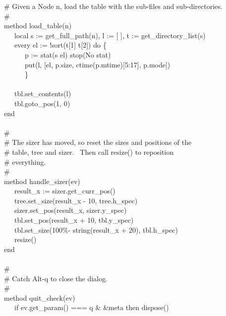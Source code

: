 {\>   \# Given a Node n, load the table with the sub-files and sub-directories.\\
\>   \# \\
\>   method load\_table(n) \\
\>   \ \ \ local s := get\_full\_path(n), l := [ ], t := get\_directory\_list(s) \\
\>   \ \ \ every el := !sort(t[1] {\textbar}{\textbar}{\textbar} t[2])
do \{ \\
\>   \ \ \ \ \ \ p := stat(s {\textbar}{\textbar} el) {\textbar}
stop({\textquotedbl}No stat{\textquotedbl}) \\
\>   \ \ \ \ \ \ put(l, [el, p.size, ctime(p.mtime)[5:17], p.mode]) \\
\>   \ \ \ \ \ \ \} \\
\ \\
\>   \ \ \ tbl.set\_contents(l) \\
\>   \ \ \ tbl.goto\_pos(1, 0) \\
\>   end \\
\ \\
\>   \# \\
\>   \# The sizer has moved, so reset the sizes and positions of the \\
\>   \# table, tree and sizer. \ Then call resize() to reposition \\
\>   \# everything. \\
\>   \# \\
\>   method handle\_sizer(ev) \\
\>   \ \ \ result\_x := sizer.get\_curr\_pos() \\
\>   \ \ \ tree.set\_size(result\_x - 10, tree.h\_spec) \\
\>   \ \ \ sizer.set\_pos(result\_x, sizer.y\_spec) \\
\>   \ \ \ tbl.set\_pos(result\_x + 10, tbl.y\_spec) \\
\>   \ \ \ tbl.set\_size({\textquotedbl}100\%-{\textquotedbl} {\textbar}{\textbar} string(result\_x + 20), tbl.h\_spec) \\
\>   \ \ \ resize() \\
\>   end \\
\ \\
\>   \# \\
\>   \# Catch Alt-q to close the dialog. \\
\>   \# \\
\>   method quit\_check(ev) \\
\>   \ \ \ if ev.get\_param() === {\textquotedbl}q{\textquotedbl} \&
\&meta then dispose() \\
}
